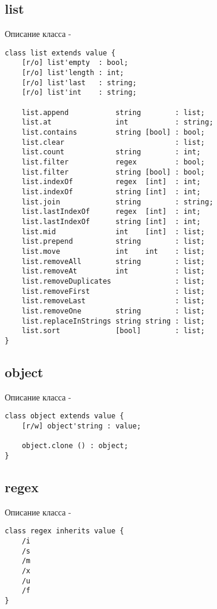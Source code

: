 \subsection{{\color{lightblue} list}}

\noindent Описание класса \listtype -
\begin{verbatim}
class list extends value {
    [r/o] list'empty  : bool;
    [r/o] list'length : int;
    [r/o] list'last   : string;
    [r/o] list'int    : string;

    list.append           string        : list;
    list.at               int           : string;
    list.contains         string [bool] : bool;
    list.clear                          : list;
    list.count            string        : int;
    list.filter           regex         : bool;
    list.filter           string [bool] : bool;
    list.indexOf          regex  [int]  : int;
    list.indexOf          string [int]  : int;
    list.join             string        : string;
    list.lastIndexOf      regex  [int]  : int;
    list.lastIndexOf      string [int]  : int;
    list.mid              int    [int]  : list;
    list.prepend          string        : list;
    list.move             int    int    : list;
    list.removeAll        string        : list;
    list.removeAt         int           : list;
    list.removeDuplicates               : list;
    list.removeFirst                    : list;
    list.removeLast                     : list;
    list.removeOne        string        : list;
    list.replaceInStrings string string : list;
    list.sort             [bool]        : list;
}
\end{verbatim}

\subsection{{\color{lightblue} object}}

\noindent Описание класса \object -
\begin{verbatim}
class object extends value {
    [r/w] object'string : value;
    
    object.clone () : object;
}
\end{verbatim}

\subsection{{\color{lightblue} regex}}

\noindent Описание класса \regex -
\begin{verbatim}
class regex inherits value {
    /i
    /s
    /m
    /x
    /u
    /f
}
\end{verbatim}

